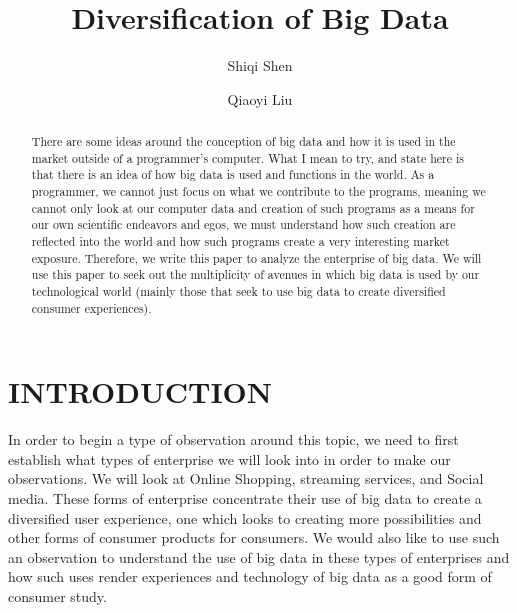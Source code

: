 \documentclass[sigconf]{acmart}
\begin{document}
\title{Diversification of Big Data}

\author{Shiqi Shen}

\author{Qiaoyi Liu}

\begin{abstract}

There are some ideas around the conception of big data and how it is used in the market outside of a programmer’s computer. What I mean to try, and state here is that there is an idea of how big data is used and functions in the world. As a programmer, we cannot just focus on what we contribute to the programs, meaning we cannot only look at our computer data and creation of such programs as a means for our own scientific endeavors and egos, we must understand how such creation are reflected into the world and how such programs create a very interesting market exposure. Therefore, we write this paper to analyze the enterprise of big data. We will use this paper to seek out the multiplicity of avenues in which big data is used by our technological world (mainly those that seek to use big data to create diversified consumer experiences). 

\end{abstract}


\maketitle

\section{INTRODUCTION}

In order to begin a type of observation around this topic, we need to first establish what types of enterprise we will look into in order to make our observations. We will look at Online Shopping, streaming services, and Social media. These forms of enterprise concentrate their use of big data to create a diversified user experience, one which looks to creating more possibilities and other forms of consumer products for consumers. We would also like to use such an observation to understand the use of big data in these types of enterprises and how such uses render experiences and technology of big data as a good form of consumer study.
\end{document}
